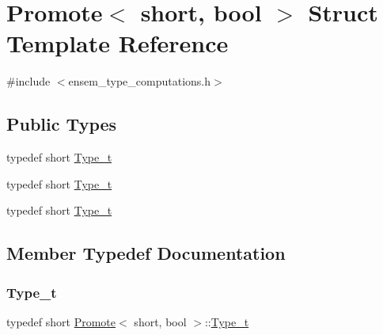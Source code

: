 \hypertarget{structPromote_3_01short_00_01bool_01_4}{}\section{Promote$<$ short, bool $>$ Struct Template Reference}
\label{structPromote_3_01short_00_01bool_01_4}


{\ttfamily \#include $<$ensem\+\_\+type\+\_\+computations.\+h$>$}

\subsection*{Public Types}
\begin{DoxyCompactItemize}
\item 
typedef short \mbox{\hyperlink{structPromote_3_01short_00_01bool_01_4_a4f4ef8db654939c693bf155cff1e36a3}{Type\+\_\+t}}
\item 
typedef short \mbox{\hyperlink{structPromote_3_01short_00_01bool_01_4_a4f4ef8db654939c693bf155cff1e36a3}{Type\+\_\+t}}
\item 
typedef short \mbox{\hyperlink{structPromote_3_01short_00_01bool_01_4_a4f4ef8db654939c693bf155cff1e36a3}{Type\+\_\+t}}
\end{DoxyCompactItemize}


\subsection{Member Typedef Documentation}
\mbox{\label{structPromote_3_01short_00_01bool_01_4_a4f4ef8db654939c693bf155cff1e36a3}} 
\subsubsection{\texorpdfstring{Type\_t}{Type\_t}\hspace{0.1cm}{\footnotesize\ttfamily [1/3]}}
{\footnotesize\ttfamily typedef short \mbox{\hyperlink{structPromote}{Promote}}$<$ short, bool $>$\+::\mbox{\hyperlink{structPromote_3_01short_00_01bool_01_4_a4f4ef8db654939c693bf155cff1e36a3}{Type\+\_\+t}}}

\mbox{\label{structPromote_3_01short_00_01bool_01_4_a4f4ef8db654939c693bf155cff1e36a3}} 
